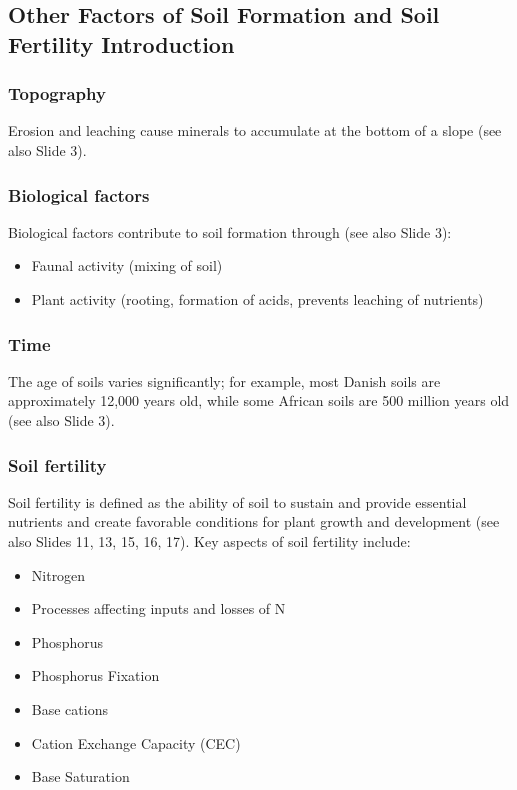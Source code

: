 \subsection{Other Factors of Soil Formation and Soil Fertility Introduction} 
\subsubsection{Topography} 
Erosion and leaching cause minerals to accumulate at the bottom of a slope (see also Slide 3).

\subsubsection{Biological factors} 
Biological factors contribute to soil formation through (see also Slide 3): 

\begin{itemize} 
    \item Faunal activity (mixing of soil) 
    \item Plant activity (rooting, formation of acids, prevents leaching of nutrients) 
\end{itemize}

\subsubsection{Time} 
The age of soils varies significantly; for example, most Danish soils are approximately 12,000 years old, while some African soils are 500 million years old (see also Slide 3).

\subsubsection{Soil fertility} 
Soil fertility is defined as the ability of soil to sustain and provide essential nutrients and create favorable conditions for plant growth and development (see also Slides 11, 13, 15, 16, 17). Key aspects of soil fertility include:
\begin{itemize} 
    \item Nitrogen 
    \item Processes affecting inputs and losses of N 
    \item Phosphorus 
    \item Phosphorus Fixation 
    \item Base cations 
    \item Cation Exchange Capacity (CEC) 
    \item Base Saturation 
\end{itemize}


